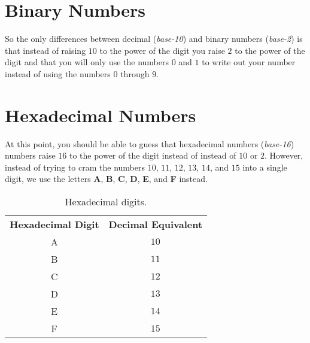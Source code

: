\documentclass{article}
\begin{document}
\section{Binary Numbers}

So the only differences between decimal (\textit{base-10}) and binary numbers (\textit{base-2}) is that instead of raising $10$ to the power of the digit you raise $2$ to the power of the digit and that you will only use the numbers $0$ and $1$ to write out your number instead of using the numbers $0$ through $9$.

\section{Hexadecimal Numbers}

At this point, you should be able to guess that hexadecimal numbers (\textit{base-16}) numbers raise $16$ to the power of the digit instead of instead of $10$ or $2$.
However, instead of trying to cram the numbers $10$, $11$, $12$, $13$, $14$, and $15$ into a single digit, we use the letters \textbf{A}, \textbf{B}, \textbf{C}, \textbf{D}, \textbf{E}, and \textbf{F} instead.

\begin{table}
\centering
\caption{Hexadecimal digits.}
\begin{tabularx}{0.5\textwidth}{ |C|C| }
\hline
\textbf{Hexadecimal Digit} & \textbf{Decimal Equivalent} \\
A & $10$ \\
B & $11$ \\
C & $12$ \\
D & $13$ \\
E & $14$ \\
F & $15$ \\
\hline
\end{tabularx}
\end{table}
\end{document}
